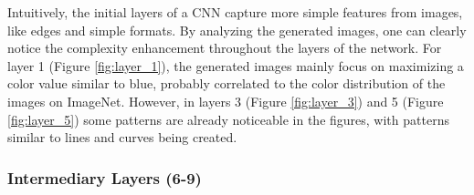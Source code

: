 Intuitively, the initial layers of a CNN capture more simple features from images, like edges and simple formats.
By analyzing the generated images, one can clearly notice the complexity enhancement throughout the layers of the network. 
For layer 1 (Figure \ref{fig:layer_1}), the generated images mainly focus on maximizing a color value similar to blue, probably correlated to the color distribution of the images on ImageNet.
However, in layers 3 (Figure \ref{fig:layer_3}) and 5 (Figure \ref{fig:layer_5}) some patterns are already noticeable in the figures, with patterns similar to lines and curves being created.

\subsubsection{Intermediary Layers (6-9)}


